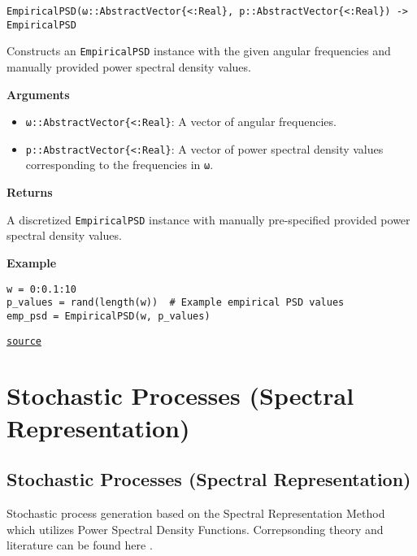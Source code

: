 \begin{adjustwidth}{2em}{0pt}


\begin{verbatim}
EmpiricalPSD(ω::AbstractVector{<:Real}, p::AbstractVector{<:Real}) -> EmpiricalPSD
\end{verbatim}

Constructs an \texttt{EmpiricalPSD} instance with the given angular frequencies and manually provided power spectral density values.

\textbf{Arguments}

\begin{itemize}
\item \texttt{ω::AbstractVector\{<:Real\}}: A vector of angular frequencies.


\item \texttt{p::AbstractVector\{<:Real\}}: A vector of power spectral density values corresponding to the frequencies in \texttt{ω}.

\end{itemize}
\textbf{Returns}

A discretized \texttt{EmpiricalPSD} instance with manually pre-specified provided power spectral density values.

\textbf{Example}


\begin{verbatim}
w = 0:0.1:10
p_values = rand(length(w))  # Example empirical PSD values
emp_psd = EmpiricalPSD(w, p_values)
\end{verbatim}



\href{https://github.com/friesischscott/UncertaintyQuantification.jl/blob/f5ee6cce729f0d6a57979257379c942cdf42f86f/src/dynamics/psd.jl#L139-L157}{\texttt{source}}


\end{adjustwidth}

\chapter{Stochastic Processes (Spectral Representation)}


\section{Stochastic Processes (Spectral Representation)}



\label{11408399352375379803}{}


Stochastic process generation based on the Spectral Representation Method which utilizes Power Spectral Density Functions. Correpsonding theory and literature can be found here .



